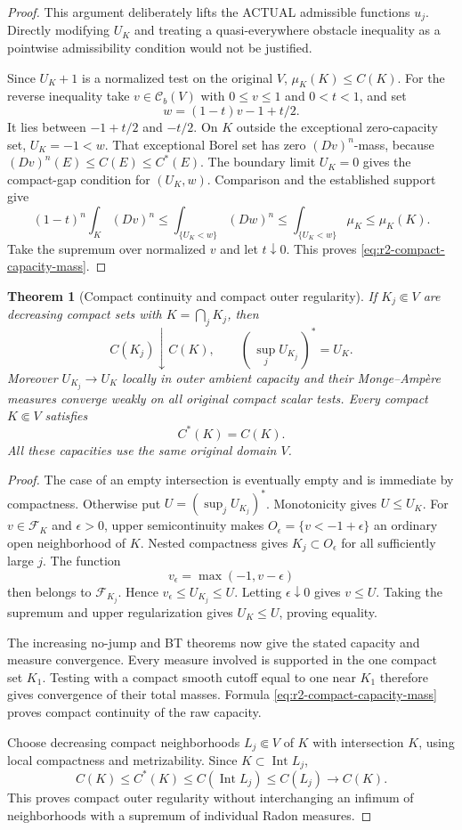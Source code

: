 \documentclass[11pt,a4paper]{article}
\numberwithin{equation}{section}
\newtheorem{theorem}{Theorem}[section]
\theoremstyle{definition}
\theoremstyle{remark}
\newcommand{\Cb}{\mathcal C_b}
\begin{document}
\begin{proof}
This argument deliberately lifts the ACTUAL admissible
functions $u_j$. Directly modifying $U_K$ and treating a
quasi-everywhere obstacle inequality as a pointwise
admissibility condition would not be justified.

Since $U_K+1$ is a normalized test on the original $V$,
$\mu_K(K)\leq C(K)$. For the reverse inequality take
$v\in\Cb(V)$ with $0\leq v\leq1$ and $0<t<1$, and set
\[
 w=(1-t)v-1+t/2.
\]
It lies between $-1+t/2$ and $-t/2$. On $K$ outside the
exceptional zero-capacity set, $U_K=-1<w$.
That exceptional Borel set has zero $(Dv)^n$-mass, because
$(Dv)^n(E)\leq C(E)\leq C^*(E)$.
The boundary limit $U_K=0$ gives the compact-gap condition
for $(U_K,w)$. Comparison and the established support give
\[
 (1-t)^n\int_K(Dv)^n
 \leq\int_{\{U_K<w\}}(Dw)^n
 \leq\int_{\{U_K<w\}}\mu_K
 \leq\mu_K(K).
\]
Take the supremum over normalized $v$ and let $t\downarrow0$.
This proves \eqref{eq:r2-compact-capacity-mass}.
\end{proof}

\begin{theorem}[Compact continuity and compact outer regularity]
\label{thm:r2-compact-capacity-continuity}
If $K_j\Subset V$ are decreasing compact sets with
$K=\bigcap_jK_j$, then
\[
 C(K_j)\downarrow C(K),\qquad
 (\,\sup_j U_{K_j}\,)^*=U_K.
\]
Moreover $U_{K_j}\to U_K$ locally in outer ambient capacity
and their Monge--Amp\`ere measures converge weakly on all
original compact scalar tests. Every compact $K\Subset V$
satisfies
\[
 C^*(K)=C(K).
\]
All these capacities use the same original domain $V$.
\end{theorem}

\begin{proof}
The case of an empty intersection is eventually empty and
is immediate by compactness. Otherwise put
$U=(\sup_jU_{K_j})^*$. Monotonicity gives $U\leq U_K$.
For $v\in\mathcal F_K$ and $\epsilon>0$, upper
semicontinuity makes
$O_\epsilon=\{v<-1+\epsilon\}$ an ordinary open
neighborhood of $K$. Nested compactness gives
$K_j\subset O_\epsilon$ for all sufficiently large $j$.
The function
\[
 v_\epsilon=\max(-1,v-\epsilon)
\]
then belongs to $\mathcal F_{K_j}$. Hence
$v_\epsilon\leq U_{K_j}\leq U$. Letting
$\epsilon\downarrow0$ gives $v\leq U$.
Taking the supremum and upper regularization gives
$U_K\leq U$, proving equality.

The increasing no-jump and BT theorems now give the stated
capacity and measure convergence. Every measure involved
is supported in the one compact set $K_1$. Testing with
a compact smooth cutoff equal to one near $K_1$ therefore
gives convergence of their total masses. Formula
\eqref{eq:r2-compact-capacity-mass} proves compact
continuity of the raw capacity.

Choose decreasing compact neighborhoods $L_j\Subset V$
of $K$ with intersection $K$, using local compactness
and metrizability. Since $K\subset\operatorname{Int}L_j$,
\[
 C(K)\leq C^*(K)
 \leq C(\operatorname{Int}L_j)
 \leq C(L_j)\longrightarrow C(K).
\]
This proves compact outer regularity without interchanging
an infimum of neighborhoods with a supremum of individual
Radon measures.
\end{proof}
\end{document}
